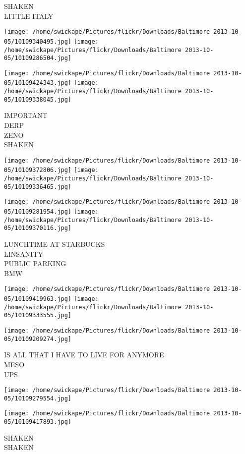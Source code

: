 \documentclass[10pt,letterpaper]{article}
\begin{document}
SHAKEN\\
LITTLE ITALY
\pagebreak

\texttt{[image: /home/swickape/Pictures/flickr/Downloads/Baltimore 2013-10-05/10109340495.jpg]}
\texttt{[image: /home/swickape/Pictures/flickr/Downloads/Baltimore 2013-10-05/10109286504.jpg]}

\texttt{[image: /home/swickape/Pictures/flickr/Downloads/Baltimore 2013-10-05/10109424343.jpg]}
\texttt{[image: /home/swickape/Pictures/flickr/Downloads/Baltimore 2013-10-05/10109338045.jpg]}

IMPORTANT\\
DERP\\
ZENO\\
SHAKEN
\pagebreak

\texttt{[image: /home/swickape/Pictures/flickr/Downloads/Baltimore 2013-10-05/10109372806.jpg]}
\texttt{[image: /home/swickape/Pictures/flickr/Downloads/Baltimore 2013-10-05/10109336465.jpg]}

\texttt{[image: /home/swickape/Pictures/flickr/Downloads/Baltimore 2013-10-05/10109281954.jpg]}
\texttt{[image: /home/swickape/Pictures/flickr/Downloads/Baltimore 2013-10-05/10109370116.jpg]}

LUNCHTIME AT STARBUCKS\\
LINSANITY\\
PUBLIC PARKING\\
BMW
\pagebreak

\texttt{[image: /home/swickape/Pictures/flickr/Downloads/Baltimore 2013-10-05/10109419963.jpg]}
\texttt{[image: /home/swickape/Pictures/flickr/Downloads/Baltimore 2013-10-05/10109333555.jpg]}

\texttt{[image: /home/swickape/Pictures/flickr/Downloads/Baltimore 2013-10-05/10109209274.jpg]}

IS ALL THAT I HAVE TO LIVE FOR ANYMORE\\
MESO\\
UPS
\pagebreak

\texttt{[image: /home/swickape/Pictures/flickr/Downloads/Baltimore 2013-10-05/10109279554.jpg]}

\vspace{0.25in}
\texttt{[image: /home/swickape/Pictures/flickr/Downloads/Baltimore 2013-10-05/10109417893.jpg]}

SHAKEN\\
SHAKEN
\pagebreak
\end{document}
